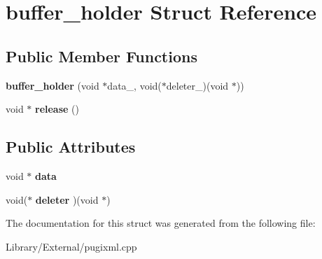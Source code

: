 \hypertarget{structbuffer__holder}{}\section{buffer\+\_\+holder Struct Reference}
\label{structbuffer__holder}
\subsection*{Public Member Functions}
\begin{DoxyCompactItemize}
\item 
\hypertarget{structbuffer__holder_aec91ad4dabc8db2a6cacac601b317857}{}{\bfseries buffer\+\_\+holder} (void $\ast$data\+\_\+, void($\ast$deleter\+\_\+)(void $\ast$))\label{structbuffer__holder_aec91ad4dabc8db2a6cacac601b317857}

\item 
\hypertarget{structbuffer__holder_add9b75027bdf15dee0e2dc88225d5b10}{}void $\ast$ {\bfseries release} ()\label{structbuffer__holder_add9b75027bdf15dee0e2dc88225d5b10}

\end{DoxyCompactItemize}
\subsection*{Public Attributes}
\begin{DoxyCompactItemize}
\item 
\hypertarget{structbuffer__holder_a06c1e1004fac90848dfdb4fbc150cede}{}void $\ast$ {\bfseries data}\label{structbuffer__holder_a06c1e1004fac90848dfdb4fbc150cede}

\item 
\hypertarget{structbuffer__holder_aaa4c46fb7eda13e5f3f24b595abf8b8e}{}void($\ast$ {\bfseries deleter} )(void $\ast$)\label{structbuffer__holder_aaa4c46fb7eda13e5f3f24b595abf8b8e}

\end{DoxyCompactItemize}


The documentation for this struct was generated from the following file\+:\begin{DoxyCompactItemize}
\item 
Library/\+External/pugixml.\+cpp\end{DoxyCompactItemize}
